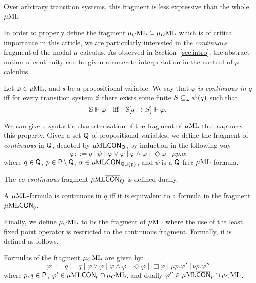 Over arbitrary transition systems, this fragment is
less expressive than the whole $\mu\mathrm{ML}$~\cite{Park79}. %

In order to properly define the fragment $\mu_{C}\mathrm{ML} \subseteq \mu_{D}\mathrm{ML}$ which is of critical importance in this article, we are particularly interested in the \emph{continuous} fragment of the modal $\mu$-calculus. As observed in Section~\ref{sec:intro}, the abstract notion of continuity can be given a concrete interpretation in the context of $\mu$-calculus.
%
\begin{definition}
Let $\varphi \in \mu\mathrm{ML}$, and $q$ be a propositional variable. We say that \emph{$\varphi$ is continuous in $q$} iff for every transition system $\mathbb{S}$ there exists some finite $S \subseteq_\omega \kappa^\natural(q)$ such that
$$
\model \mmodels \varphi \quad\text{iff}\quad \model[q \mapsto S] \mmodels \varphi .
$$
\end{definition}

We can give a syntactic characterisation of the fragment of $\mu\mathrm{ML}$ that captures this property. Given a set $\mathsf{Q}$ of propositional variables, we define the fragment of \MC \emph{continuous} in $\mathsf{Q}$, denoted by $\mu\mathrm{ML}\mathsf{CON}_{\mathsf{Q}}$, by induction in the following way
\begin{equation*}
   \varphi ::= q
   \mid \psi
   \mid \varphi \lor \varphi
   \mid \varphi \land \varphi
   \mid \Diamond \varphi
   \mid \mu p.\alpha
\end{equation*}
%
where $q \in \mathsf{Q}$, $p \in \mathsf{P} \setminus \mathsf{Q}$, $\alpha \in \mu\mathrm{ML}\mathsf{CON}_{\mathsf{Q}\cup\{p\}}$, and $\psi$ is a $\mathsf{Q}$-free $\mu\mathrm{ML}$-formula. 

The  \emph{co-continuous} fragment $\mu\mathrm{ML}\overline{\mathsf{CON}}_{Q}$ is defined dually. 

\begin{proposition}\label{prop:FVcont}
A $\mu\mathrm{ML}$-formula is continuous in $q$ iff it is equivalent to a formula in the fragment $\mu\mathrm{ML}\mathsf{CON}_{q}$.
\end{proposition}

Finally, we define $\mu_{C}\mathrm{ML}$ to be the fragment of $\mu\mathrm{ML}$ where the use of the least fixed point operator is restricted to the continuous fragment. Formally, it is defined as follows.

\begin{definition}
Formulas of the fragment $\mu_{C}\mathrm{ML}$ are given by:%
\begin{equation*}
   \varphi ::= q \mid \lnot q
    \mid \varphi \lor \varphi
        \mid \varphi \land \varphi
    \mid \Diamond \varphi
     \mid \Box \varphi \mid
    \mu p.\varphi' 
    \mid \nu p.\varphi''
    \end{equation*}
%
where $p,q \in \mathsf{P}$,  $\varphi' \in \mu\mathrm{ML}\mathsf{CON}_{p} \cap \mu_{C}\mathrm{ML}$, and dually $\varphi'' \in \mu\mathrm{ML}\overline{\mathsf{CON}}_{p} \cap \mu_{C}\mathrm{ML}$.
\end{definition}

